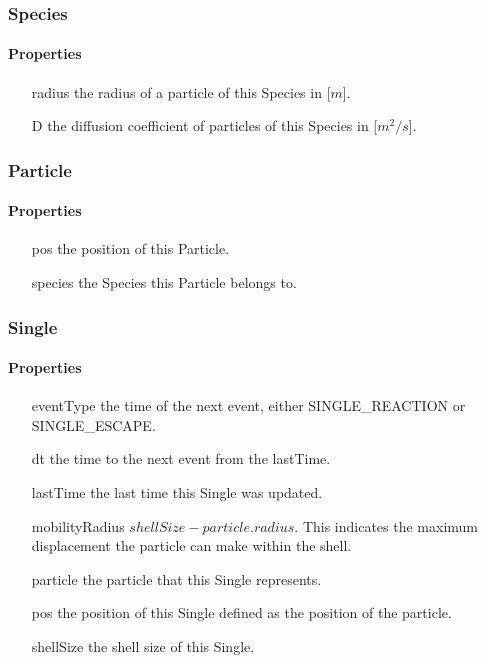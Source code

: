 \documentclass[english]{article}
\begin{document}
\subsubsection{Species}

\paragraph{Properties}

\begin{itemize}
\item[radius] the radius of a particle of this Species in [$m$].
\item[D] the diffusion coefficient of particles of this Species in [$m^2/s$].
\end{itemize}

\subsubsection{Particle}

\paragraph{Properties}

\begin{itemize}
\item[pos] the position of this Particle.
\item[species] the Species this Particle belongs to.
\end{itemize}

\subsubsection{Single}

\paragraph{Properties}

\begin{itemize}
\item[eventType] the time of the next event, either SINGLE_REACTION or 
  SINGLE_ESCAPE.
\item[dt] the time to the next event from the lastTime.
\item[lastTime] the last time this Single was updated.
\item[mobilityRadius] $shellSize - particle.radius$.  This
  indicates the maximum displacement the particle can make within the
  shell.
\item[particle] the particle that this Single represents.
\item[pos] the position of this Single defined as the position of the
  particle.
\item[shellSize] the shell size of this Single.


\end{itemize}
\end{document}
